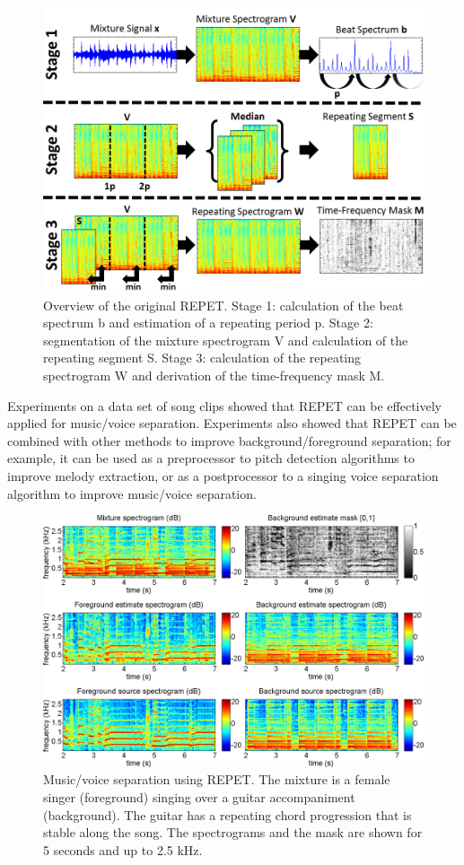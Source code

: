 \documentclass{article}
\begin{document}
\begin{figure}[!htb]
\centering
\includegraphics[width=\columnwidth]{Images/repet_original_overview.png}
\caption{Overview of the original REPET. Stage 1: calculation of the beat spectrum b and estimation of a repeating period p. Stage 2: segmentation of the mixture spectrogram V and calculation of the repeating segment S. Stage 3: calculation of the repeating spectrogram W and derivation of the time-frequency mask M.}
\label{fig:repet_original_overview}
\end{figure}

Experiments on a data set of song clips showed that REPET can be effectively applied for music/voice separation. Experiments also showed that REPET can be combined with other methods to improve background/foreground separation; for example, it can be used as a preprocessor to pitch detection algorithms to improve melody extraction, or as a postprocessor to a singing voice separation algorithm to improve music/voice separation.

\begin{figure}[!htb]
\centering
\includegraphics[width=\columnwidth]{Images/repet_original_example.png}
\caption{Music/voice separation using REPET. The mixture is a female singer (foreground) singing over a guitar accompaniment (background). The guitar has a repeating chord progression that is stable along the song. The spectrograms and the mask are shown for 5 seconds and up to 2.5 kHz.}
\label{fig:repet_original_example}
\end{figure}
\end{document}
